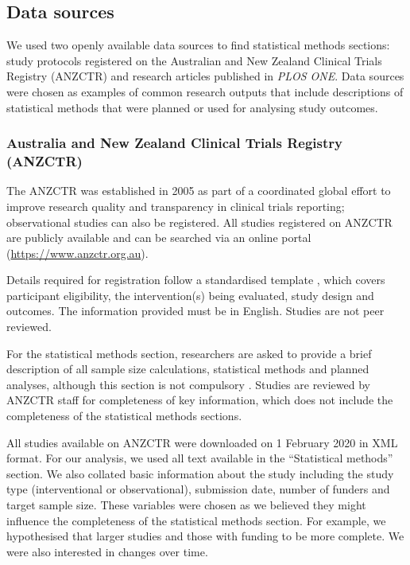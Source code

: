 \documentclass[12pt]{article}
\begin{document}
\subsection{Data sources}

We used two openly available data sources to find statistical methods
sections: study
protocols registered on the Australian and New Zealand Clinical Trials
Registry (ANZCTR) and research articles published in \emph{PLOS ONE}. Data sources were chosen as examples of common
research outputs that include descriptions of statistical methods that
were planned or used for analysing study outcomes.

\subsubsection{Australia and New Zealand Clinical Trials Registry (ANZCTR)}
\label{sec:methodsANZCTR}

The ANZCTR was established in 2005 as part of a coordinated global
effort to improve research quality and transparency in clinical trials
reporting; observational studies can also be registered. All studies
registered on ANZCTR are publicly available and can be searched via an
online portal (\url{https://www.anzctr.org.au}).

Details required for registration follow a standardised template
\citep{ANZCTR}, which covers participant eligibility, the
intervention(s) being evaluated, study design and outcomes. The
information provided must be in English. Studies are not peer reviewed.

For the statistical methods section, researchers are asked to provide a
brief description of all sample size calculations, statistical
methods and planned analyses, although this section is not compulsory
\citep{ANZCTR}. Studies are reviewed by ANZCTR staff for completeness of
key information, which does not include the completeness of the
statistical methods sections.

All studies available on ANZCTR were downloaded on 1 February 2020 in
XML format. For our analysis, we used all text available in the ``Statistical
methods'' section. We also collated basic information about the study
including the study type (interventional or observational), submission
date, number of funders and target sample size. These variables were
chosen as we believed they might influence the completeness of the
statistical methods section. For example, we hypothesised that larger studies and
those with funding to be more complete. We were also interested in
changes over time.
\end{document}
